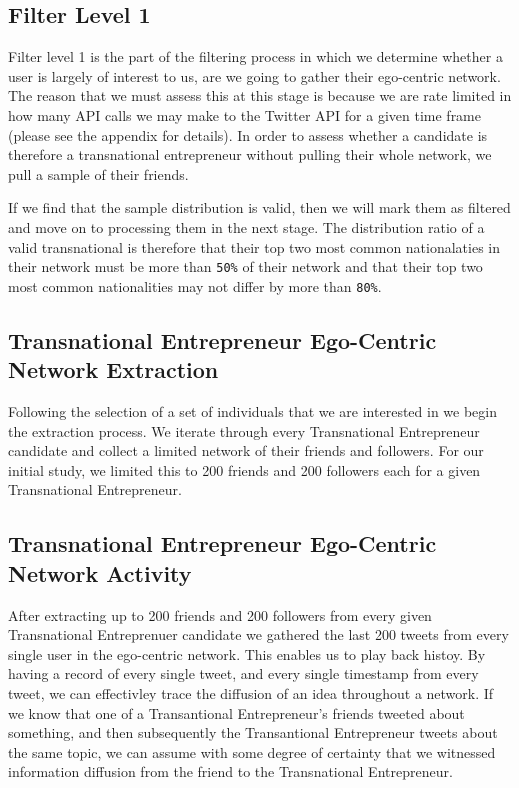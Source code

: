 \subsection{Filter Level 1}
Filter level 1 is the part of the filtering process in which we determine whether a user is largely of interest to us, are we going to gather their ego-centric network. The reason that we must assess this at this stage is because we are rate limited in how many API calls we may make to the Twitter API for a given time frame (please see the appendix for details). In order to assess whether a candidate is therefore a transnational entrepreneur without pulling their whole network, we pull a sample of their friends.
\par
If we find that the sample distribution is valid, then we will mark them as filtered and move on to processing them in the next stage. The distribution ratio of a valid transnational is therefore that their top two most common nationalaties in their network must be more than \verb|50%| of their network and that their top two most common nationalities may not differ by more than \verb|80%|.

\subsection{Transnational Entrepreneur Ego-Centric Network Extraction}
Following the selection of a set of individuals that we are interested in we begin the extraction process. We iterate through every Transnational Entrepreneur candidate and collect a limited network of their friends and followers. For our initial study, we limited this to 200 friends and 200 followers each for a given Transnational Entrepreneur.

\subsection{Transnational Entrepreneur Ego-Centric Network Activity}
After extracting up to 200 friends and 200 followers from every given Transnational Entreprenuer candidate we gathered the last 200 tweets from every single user in the ego-centric network. This enables us to play back histoy. By having a record of every single tweet, and every single timestamp from every tweet, we can effectivley trace the diffusion of an idea throughout a network. If we know that one of a Transantional Entrepreneur's friends tweeted about something, and then subsequently the Transantional Entrepreneur tweets about the same topic, we can assume with some degree of certainty that we witnessed information diffusion from the friend to the Transnational Entrepreneur.

